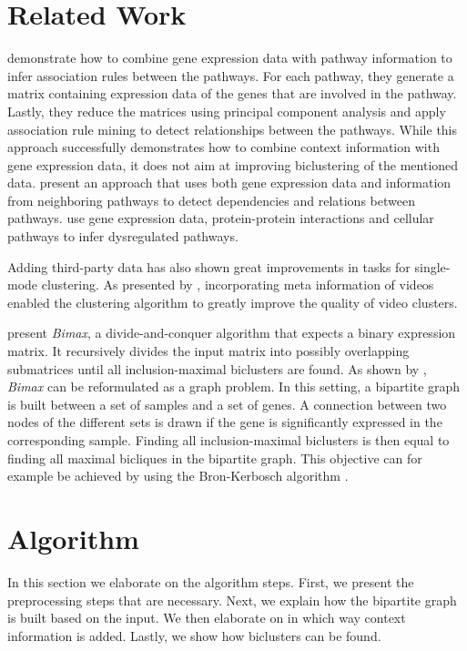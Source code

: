 \documentclass[10pt, conference, compsocconf]{IEEEtran}
\begin{document}
\section{Related Work}
\label{sec:related}
\cite{Ponzoni2014} demonstrate how to combine gene expression data with pathway information to infer association rules between the pathways.
For each pathway, they generate a matrix containing expression data of the genes that are involved in the pathway.
Lastly, they reduce the matrices using principal component analysis and apply association rule mining to detect relationships between the pathways.
While this approach successfully demonstrates how to combine context information with gene expression data, it does not aim at improving biclustering of the mentioned data.
\cite{Dutta2012} present an approach that uses both gene expression data and information from neighboring pathways to detect dependencies and relations between pathways.
\cite{Liu2012} use gene expression data, protein-protein interactions and cellular pathways to infer dysregulated pathways.

Adding third-party data has also shown great improvements in tasks for single-mode clustering.
As presented by \cite{Hindle11}, incorporating meta information of videos enabled the clustering algorithm to greatly improve the quality of video clusters.


\cite{Prelic06} present \textit{Bimax}, a divide-and-conquer algorithm that expects a binary expression matrix.
It recursively divides the input matrix into possibly overlapping submatrices until all inclusion-maximal biclusters are found.
As shown by \cite{Voggenreiter12}, \textit{Bimax} can be reformulated as a graph problem.
In this setting, a bipartite graph is built between a set of samples and a set of genes.
A connection between two nodes of the different sets is drawn if the gene is significantly expressed in the corresponding sample.
Finding all inclusion-maximal biclusters is then equal to finding all maximal bicliques in the bipartite graph.
This objective can for example be achieved by using the Bron-Kerbosch algorithm \citep{Bron73}.

\section{Algorithm}
\label{sec:algorithm}
In this section we elaborate on the algorithm steps.
First, we present the preprocessing steps that are necessary.
Next, we explain how the bipartite graph is built based on the input.
We then elaborate on in which way context information is added.
Lastly, we show how biclusters can be found.
\end{document}
